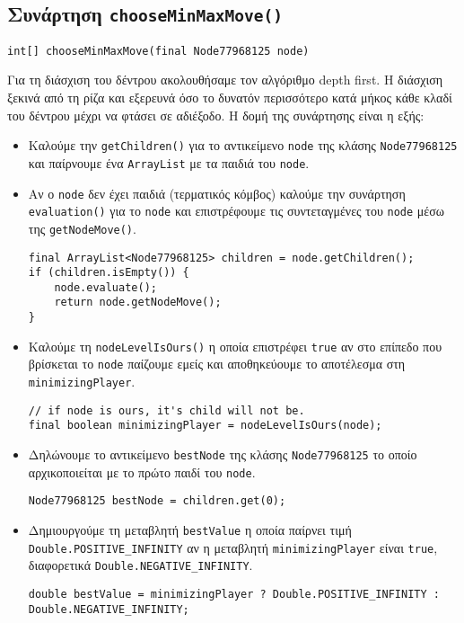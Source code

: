 \subsection{Συνάρτηση \texttt{chooseMinMaxMove()}}
\begin{lstlisting}[style=declaration]
int[] chooseMinMaxMove(final Node77968125 node)
\end{lstlisting}
Για τη διάσχιση του δέντρου ακολουθήσαμε τον αλγόριθμο depth first.
Η διάσχιση ξεκινά από τη ρίζα και εξερευνά όσο το δυνατόν περισσότερο κατά μήκος κάθε κλαδί του δέντρου μέχρι να φτάσει σε αδιέξοδο.
Η δομή της συνάρτησης είναι η εξής:
\begin{itemize}
\item Καλούμε την \lstinline!getChildren()! για το αντικείμενο \lstinline!node! της κλάσης \lstinline!Node77968125! και παίρνουμε ένα
\lstinline!ArrayList! με τα παιδιά του \lstinline!node!.

\item Αν ο \lstinline!node! δεν έχει παιδιά (τερματικός κόμβος) καλούμε την
συνάρτηση \lstinline!evaluation()! για το \lstinline!node! και επιστρέφουμε τις συντεταγμένες του \lstinline!node! μέσω της \lstinline!getNodeMove()!.
\begin{lstlisting}[style=chunk]
final ArrayList<Node77968125> children = node.getChildren();
if (children.isEmpty()) {
    node.evaluate();
    return node.getNodeMove();
}
\end{lstlisting}

\item Καλούμε τη \lstinline!nodeLevelIsOurs()! η οποία επιστρέφει \lstinline!true! αν στο επίπεδο που βρίσκεται το
\lstinline!node! παίζουμε εμείς και αποθηκεύουμε το αποτέλεσμα στη
\lstinline!minimizingPlayer!.
\begin{lstlisting}[style=chunk]
// if node is ours, it's child will not be.
final boolean minimizingPlayer = nodeLevelIsOurs(node);
\end{lstlisting}

\item Δηλώνουμε το αντικείμενο \lstinline!bestNode! της κλάσης
\lstinline!Node77968125! το οποίο αρχικοποιείται με το πρώτο παιδί του \lstinline!node!.
\begin{lstlisting}[style=chunk]
Node77968125 bestNode = children.get(0);
\end{lstlisting}

\item \sloppy Δημιουργούμε
τη μεταβλητή \lstinline!bestValue! η οποία παίρνει τιμή \lstinline!Double.POSITIVE_INFINITY!
αν η μεταβλητή \lstinline!minimizingPlayer! είναι \lstinline!true!,
διαφορετικά \lstinline!Double.NEGATIVE_INFINITY!.
\begin{lstlisting}[style=chunk]
double bestValue = minimizingPlayer ? Double.POSITIVE_INFINITY : Double.NEGATIVE_INFINITY;
\end{lstlisting}


\end{itemize}
